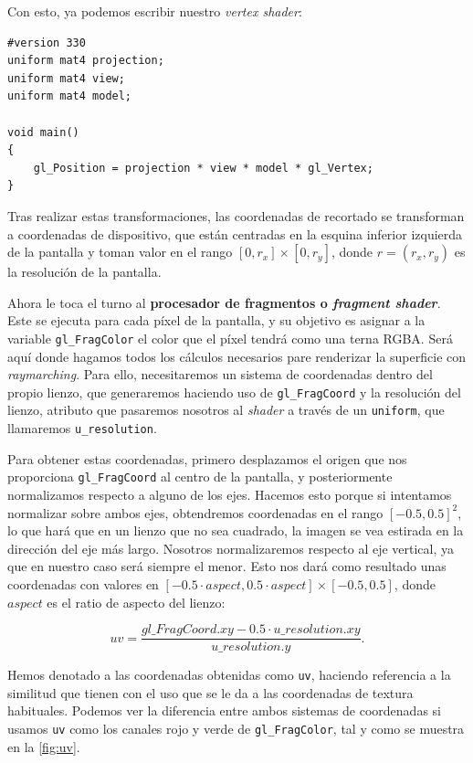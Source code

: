 Con esto, ya podemos escribir nuestro \textit{vertex shader}:
\begin{lstlisting}[title=Procesador de vértices]
#version 330    
uniform mat4 projection;
uniform mat4 view;
uniform mat4 model;

void main()
{
    gl_Position = projection * view * model * gl_Vertex;
}
\end{lstlisting}

Tras realizar estas transformaciones, las coordenadas de recortado se transforman a coordenadas de dispositivo, que están centradas en la esquina inferior izquierda de la pantalla y toman valor en el rango $[0,r_x]\times [0,r_y]$, donde $r=(r_x,r_y)$ es la resolución de la pantalla.\newline

Ahora le toca el turno al \textbf{procesador de fragmentos o \textit{fragment shader}}. Este se ejecuta para cada píxel de la pantalla, y su objetivo es asignar a la variable \texttt{gl\_FragColor} el color que el píxel tendrá como una terna RGBA. Será aquí donde hagamos todos los cálculos necesarios pare renderizar la superficie con \textit{raymarching}. Para ello, necesitaremos un sistema de coordenadas dentro del propio lienzo, que generaremos haciendo uso de \texttt{gl\_FragCoord} y la resolución del lienzo, atributo que pasaremos nosotros al \textit{shader} a través de un \texttt{uniform}, que llamaremos \texttt{u\_resolution}.

Para obtener estas coordenadas, primero desplazamos el origen que nos proporciona \texttt{gl\_FragCoord} al centro de la pantalla, y posteriormente normalizamos respecto a alguno de los ejes. Hacemos esto porque si intentamos normalizar sobre ambos ejes, obtendremos coordenadas en el rango $[-0.5,0.5]^2$, lo que hará que en un lienzo que no sea cuadrado, la imagen se vea estirada en la dirección del eje más largo. Nosotros normalizaremos respecto al eje vertical, ya que en nuestro caso será siempre el menor. Esto nos dará como resultado unas coordenadas con valores en $\left[ -0.5\cdot aspect, 0.5\cdot aspect \right] \times [-0.5, 0.5]$, donde $aspect$ es el ratio de aspecto del lienzo:

\begin{equation*}
    uv = \frac{gl\_FragCoord.xy - 0.5\cdot u\_resolution.xy}{u\_resolution.y}.
\end{equation*}

Hemos denotado a las coordenadas obtenidas como \texttt{uv}, haciendo referencia a la similitud que tienen con el uso que se le da a las coordenadas de textura habituales. Podemos ver la diferencia entre ambos sistemas de coordenadas si usamos \texttt{uv} como los canales rojo y verde de \texttt{gl\_FragColor}, tal y como se muestra en la \autoref{fig:uv}.\newline

